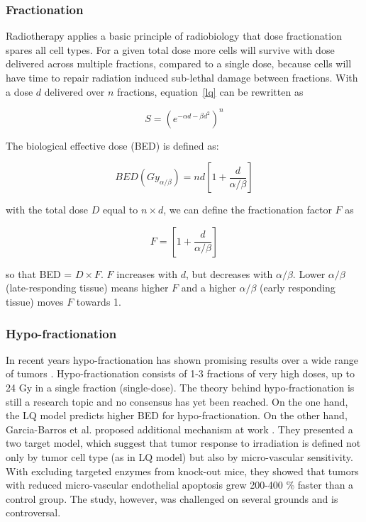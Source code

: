 \documentclass[type=dr, dr=rernat, accentcolor=tud7b,colorbacktitle, bigchapter, openright, twoside, 12pt ]{tudthesis}
\begin{document}
\subsubsection{Fractionation}

Radiotherapy applies a basic principle of radiobiology that dose fractionation spares all cell types. For a given total dose
more cells will survive with dose delivered across multiple fractions, compared to a single dose, because cells will have time to repair
radiation induced sub-lethal damage between fractions.
With a dose $d$ delivered over $n$ fractions, equation~\ref{lq} can be rewritten as \cite{Shrieve2011}

\begin{equation}
 S = (e^{-\alpha d - \beta d^2})^n
\end{equation}

The biological effective dose (BED) is defined as:

\begin{equation}
 BED(Gy_{\alpha/\beta})=nd\left[1 + \frac{d}{\alpha/\beta} \right]
\end{equation}

with the total dose $D$ equal to $n \times d$, we can define the fractionation factor $F$ as

\begin{equation}
 F = \left[1 + \frac{d}{\alpha / \beta} \right]
\end{equation}

so that BED = $D \times F$. $F$ increases with $d$, but decreases with $\alpha / \beta$. Lower $\alpha / \beta$ (late-responding tissue)
means higher $F$ and a higher $\alpha / \beta$ (early responding tissue) moves $F$ towards 1.


\subsubsection{Hypo-fractionation}

In recent years hypo-fractionation has shown promising results over a wide range of tumors \cite{Yamada2008, Greco2011, Halasz2013}. 
Hypo-fractionation consists of 1-3 fractions of very high doses, up to 24 Gy in a single fraction (single-dose). The theory behind hypo-fractionation is still a research topic
and no consensus has yet been reached. On the one hand, the LQ model predicts higher BED for hypo-fractionation. On the other hand, Garcia-Barros et al. proposed additional mechanism at work \cite{Garcia2003}.
They presented a two target model, which suggest that tumor response to irradiation is defined not only by tumor cell type (as in LQ model) but also by micro-vascular
sensitivity. With excluding targeted enzymes from knock-out mice, they showed that tumors with reduced micro-vascular endothelial apoptosis grew 200-400 \% faster than a control group. The study, however, was challenged on several grounds and is controversal.
  
\end{document}
